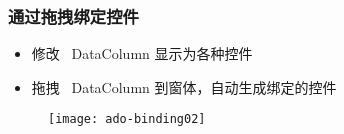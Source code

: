 \begin{frame}
\frametitle{通过拖拽绑定控件}
\begin{itemize}
\item 修改 ~DataColumn 显示为各种控件
\item 拖拽 ~DataColumn 到窗体，自动生成绑定的控件
\end{itemize}
\begin{figure}
  \centering
  \texttt{[image: ado-binding02]}
\end{figure}
\end{frame}



